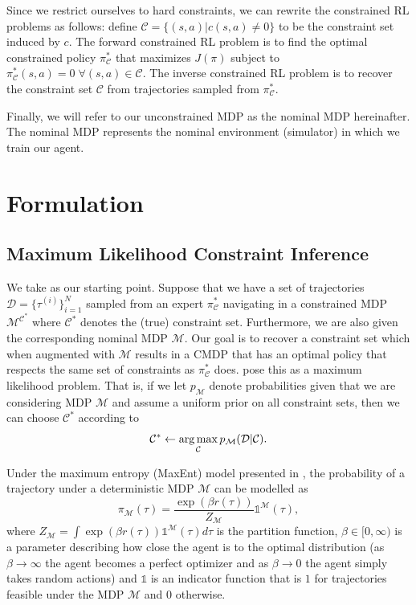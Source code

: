 \documentclass{article}
\begin{document}
Since we restrict ourselves to hard constraints, we can rewrite the constrained RL problems as follows: define $\mathcal{C} = \{(s,a) \vert c(s,a)\neq 0\}$ to be the constraint set induced by $c$. The forward constrained RL problem is to find the optimal constrained policy $\pi^*_\mathcal{C}$ that maximizes $J(\pi)$ subject to $\pi^*_\mathcal{C}(s,a) = 0 \; \forall (s,a) \in \mathcal{C}$. The inverse constrained RL problem is to recover the constraint set $\mathcal{C}$ from trajectories sampled from $\pi^*_\mathcal{C}$.

Finally, we will refer to our unconstrained MDP as the nominal MDP hereinafter. The nominal MDP represents the nominal environment (simulator) in which we train our agent.


\section{Formulation}
\subsection{Maximum Likelihood Constraint Inference}
We take \citeauthor{scobee2020maximum} as our starting point. Suppose that we have a set of trajectories $\mathcal{D}=\{\mathcal{\tau}^{(i)}\}_{i=1}^N$ sampled from an expert $\pi_\mathcal{C}^*$ navigating in a constrained MDP $\mathcal{M}^{\mathcal{C}^*}$ where $\mathcal{C}^*$ denotes the (true) constraint set. Furthermore, we are also given the corresponding nominal MDP $\mathcal{M}$. Our goal is to recover a constraint set which when augmented with $\mathcal{M}$ results in a CMDP that has an optimal policy that respects the same set of constraints as $\pi_\mathcal{C}^*$ does. \citeauthor{scobee2020maximum} pose this as a maximum likelihood problem. That is, if we let $p_\mathcal{M}$ denote probabilities given that we are considering MDP $\mathcal{M}$ and assume a uniform prior on all constraint sets, then we can choose $\mathcal{C}^*$ according to
\begin{equation}
\mathcal{C}^* \leftarrow \operatorname*{arg\,max}_\mathcal{C} p_\mathcal{M}(\mathcal{D}\vert \mathcal{C}).
\label{eq:uniform_prior}
\end{equation}

Under the maximum entropy (MaxEnt) model presented in \citet{ziebart2008maxent}, the probability of a trajectory under a deterministic MDP $\mathcal{M}$ can be modelled as
\begin{equation}
\pi_\mathcal{M}(\tau) = \frac{\exp(\beta r(\tau))}{Z_\mathcal{M}}
\mathds{1}^\mathcal{M}(\tau),
\label{eq:maxent}
\end{equation}
where $Z_\mathcal{M} = \int \exp(\beta r(\tau))\mathds{1}^\mathcal{M}(\tau) d\tau$ is the partition function, $\beta \in [0,\infty)$ is a parameter describing how close the agent is to the optimal distribution (as $\beta \rightarrow \infty$ the agent becomes a perfect optimizer and as $\beta \rightarrow 0$ the agent simply takes random actions) and $\mathds{1}$ is an indicator function that is $1$ for trajectories feasible under the MDP $\mathcal{M}$ and $0$ otherwise.
\end{document}
